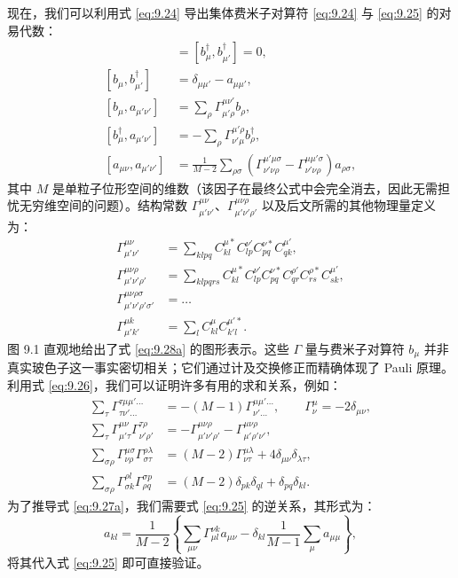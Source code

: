 现在，我们可以利用式 \ref{eq:9.24} 导出集体费米子对算符 \ref{eq:9.24} 与 \ref{eq:9.25}
的对易代数：
\begin{align}
[b_{\mu},b_{\mu'}] & =[b^{\dagger}_{\mu},b^{\dagger}_{\mu'}]=0,\label{eq:9.27a}\\{}
[b_{\mu},b^{\dagger}_{\mu'}] & =\delta_{\mu\mu'}-a_{\mu\mu'},\label{eq:9.27b}\\{}
[b_{\mu},a_{\mu'\nu'}] & =\sum_{\rho}\Gamma^{\mu\nu'}_{\mu'\rho}b_{\rho},\label{eq:9.27c}\\{}
[b^{\dagger}_{\mu},a_{\mu'\nu'}] & =-\sum_{\rho}\Gamma^{\mu'\rho}_{\nu'\mu}b^{\dagger}_{\rho},\label{eq:9.27d}\\{}
[a_{\mu\nu},a_{\mu'\nu'}] & =\frac{1}{M-2}\sum_{\rho\sigma}\left(\Gamma^{\mu'\mu\sigma}_{\nu'\nu\rho}-\Gamma^{\mu\mu'\sigma}_{\nu'\nu\rho}\right)a_{\rho\sigma},\label{eq:9.27e}
\end{align}
其中 $M$ 是单粒子位形空间的维数（该因子在最终公式中会完全消去，因此无需担忧无穷维空间的问题）。结构常数 $\Gamma^{\mu\nu}_{\mu'\nu'}$、$\Gamma^{\mu\nu\rho}_{\mu'\nu'\rho'}$
以及后文所需的其他物理量定义为：
\begin{align}
\Gamma^{\mu\nu}_{\mu'\nu'} & =\sum_{klpq}C^{\mu*}_{kl}C^{\nu'}_{lp}C^{\nu*}_{pq}C^{\mu'}_{qk},\label{eq:9.28a}\\
\Gamma^{\mu\nu\rho}_{\mu'\nu'\rho'} & =\sum_{klpqrs}C^{\mu*}_{kl}C^{\nu'}_{lp}C^{\nu*}_{pq}C^{\rho'}_{qr}C^{\rho*}_{rs}C^{\mu'}_{sk},\label{eq:9.28b}\\
\Gamma^{\mu\nu\rho\sigma}_{\mu'\nu'\rho'\sigma'} & =\ldots\nonumber \\
\Gamma^{\mu k}_{\mu'k'} & =\sum_{l}C^{\mu}_{kl}C^{\mu'*}_{k'l}.\label{eq:9.29}
\end{align}
图 9.1 直观地给出了式 \ref{eq:9.28a} 的图形表示。这些 $\Gamma$ 量与费米子对算符 $b_{\mu}$
并非真实玻色子这一事实密切相关；它们通过计及交换修正而精确体现了 Pauli 原理。利用式 \ref{eq:9.26}，我们可以证明许多有用的求和关系，例如：
\begin{align}
\sum_{\tau}\Gamma^{\tau\mu\mu'\ldots}_{\tau\nu'\ldots} & =-(M-1)\Gamma^{\mu\mu'\ldots}_{\nu'\ldots},\qquad\Gamma^{\mu}_{\nu}=-2\delta_{\mu\nu},\nonumber \\
\sum_{\tau}\Gamma^{\mu\nu}_{\mu'\tau}\Gamma^{\tau\rho}_{\nu'\rho'} & =-\Gamma^{\mu\nu\rho}_{\mu'\nu'\rho'}-\Gamma^{\mu\nu\rho}_{\mu'\rho'\nu'},\label{eq:9.30}\\
\sum_{\sigma\rho}\Gamma^{\mu\sigma}_{\nu\rho}\Gamma^{\rho\lambda}_{\sigma\tau} & =(M-2)\Gamma^{\mu\lambda}_{\nu\tau}+4\delta_{\mu\nu}\delta_{\lambda\tau},\nonumber \\
\sum_{\sigma\rho}\Gamma^{\rho l}_{\sigma k}\Gamma^{\sigma p}_{\rho q} & =(M-2)\delta_{pk}\delta_{ql}+\delta_{pq}\delta_{kl}.\nonumber 
\end{align}
为了推导式 \ref{eq:9.27a}，我们需要式 \ref{eq:9.25} 的逆关系，其形式为：
\begin{equation}
a_{kl}=\frac{1}{M-2}\left\{ \sum_{\mu\nu}\Gamma^{\nu k}_{\mu l}a_{\mu\nu}-\delta_{kl}\frac{1}{M-1}\sum_{\mu}a_{\mu\mu}\right\} ,\label{eq:9.31}
\end{equation}
将其代入式 \ref{eq:9.25} 即可直接验证。

